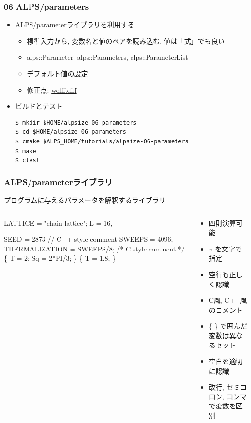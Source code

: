 \begin{frame}[fragile]
  \frametitle{06 ALPS/parameters}
  \begin{itemize}
    \item ALPS/parameterライブラリを利用する
      \begin{itemize}
        \item 標準入力から, 変数名と値のペアを読み込む. 値は「式」でも良い
        \item alps::Parameter, alps::Parameters, alps::ParameterList
        \item デフォルト値の設定
        \item 修正点: \href{https://github.com/cmsi/alps-tutorial/blob/develop/alpsize/06-wolff.diff}{wolff.diff}
      \end{itemize}
    \item ビルドとテスト
\begin{lstlisting}
$ mkdir $HOME/alpsize-06-parameters
$ cd $HOME/alpsize-06-parameters
$ cmake $ALPS_HOME/tutorials/alpsize-06-parameters
$ make
$ ctest
\end{lstlisting}
  \end{itemize}
\end{frame}

\begin{frame}[fragile]
  \frametitle{ALPS/parameterライブラリ}
  プログラムに与えるパラメータを解釈するライブラリ
  \begin{columns}
    \begin{column}{6cm}
\begin{semiverbatim}
LATTICE = "chain lattice";
L = 16,

SEED = 2873
// C++ style comment
SWEEPS = 4096;
THERMALIZATION = \alert<1>{SWEEPS/8};
/* C style comment */
\{ T = 2; Sq = 2*\alert<2>{PI}/3; \}
\{ T = 1.8; \}
\end{semiverbatim}
    \end{column}
    \begin{column}{6cm}
      \begin{itemize}
      \item 四則演算可能
      \item $\pi$ を文字で指定
      \item 空行も正しく認識
      \item C風, C++風のコメント
      \item \{ \} で囲んだ変数は異なるセット
      \item 空白を適切に認識
      \item 改行, セミコロン, コンマで変数を区別
      \end{itemize}
    \end{column}
  \end{columns}
\end{frame}

